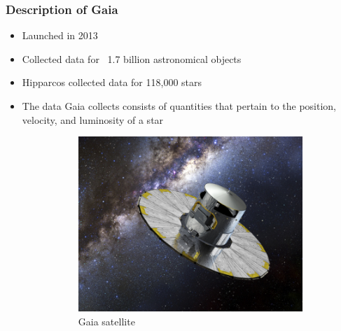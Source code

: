 \documentclass{beamer}
\begin{document}
\begin{frame}
\frametitle{Description of Gaia}
\begin{itemize}
\item Launched in 2013
\item Collected data for  ~1.7 billion astronomical objects
\item Hipparcos collected data for 118,000 stars
\item The data Gaia collects consists of quantities that pertain to the position, velocity, and luminosity of a star

\begin{figure}[h!]
  \centering
  \begin{subfigure}[b]{0.4\linewidth}
    \includegraphics[width=1\linewidth]{GaiaIm}
    \caption{Gaia satellite}
  \end{subfigure}
     \begin{subfigure}[b]{0.2\linewidth}

\end{subfigure}
\end{figure}
\end{itemize}
\end{frame}
\end{document}

